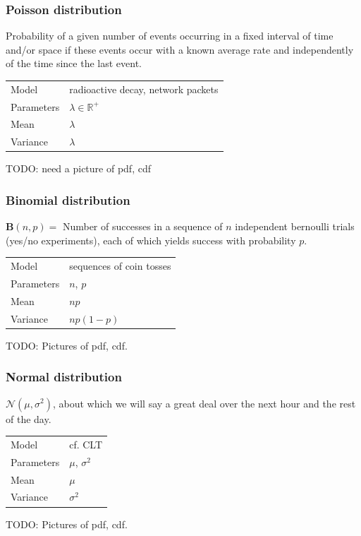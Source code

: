 \documentclass[t]{beamer}
\newcommand\N[0]{\mathcal{N}}
\newcommand\R[0]{\mathbb{R}}
\begin{document}
\begin{frame}
  \frametitle{Poisson distribution}

  Probability of a given number of events occurring in a fixed
  interval of time and/or space if these events occur with a known
  average rate and independently of the time since the last event.
  \bigskip
  
  \begin{tabular}{ll}
    Model & radioactive decay, network packets\\[1mm]
    Parameters & $\lambda\in \R^+$\\[1mm]
    Mean & $\lambda$\\[1mm]
    Variance & $\lambda$
  \end{tabular}

  TODO: need a picture of pdf, cdf
  
  \note{

  }
  
\end{frame}

\begin{frame}
  \frametitle{Binomial distribution}

  $\mathbf{B}(n,p) = $ Number of successes in a sequence of $n$ independent bernoulli
  trials (yes/no experiments), each of which yields success with
  probability $p$.
  \bigskip

  \begin{tabular}{ll}
    Model & sequences of coin tosses\\[1mm]
    Parameters & $n$, $p$\\[1mm]
    Mean & $np$\\[1mm]
    Variance & $np(1-p)$
  \end{tabular}

  TODO: Pictures of pdf, cdf.
  
  \note{

  }
  
\end{frame}

\begin{frame}
  \frametitle{Normal distribution}

  $\N(\mu,\sigma^2)$, about which we will say a great deal over the
  next hour and the rest of the day.
  \bigskip
  
  \begin{tabular}{ll}
    Model & cf. CLT\\[1mm]
    Parameters & $\mu$, $\sigma^2$\\[1mm]
    Mean & $\mu$\\[1mm]
    Variance & $\sigma^2$
  \end{tabular}

  TODO: Pictures of pdf, cdf.
  
\end{frame}
\end{document}
